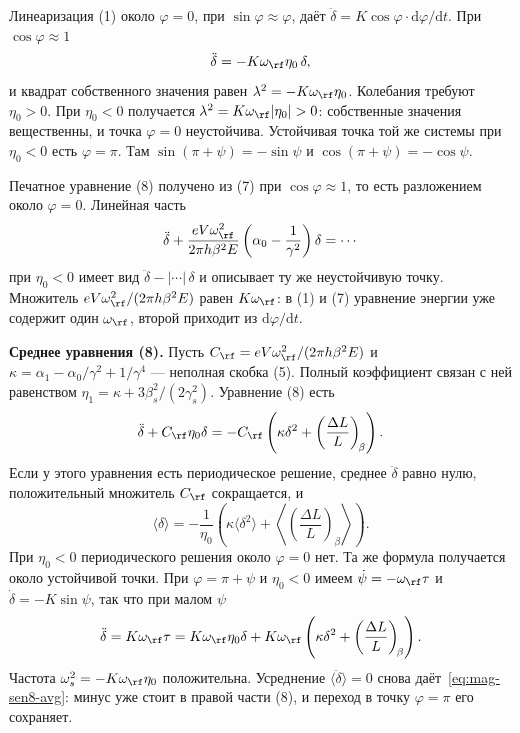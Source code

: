 Линеаризация (1) около $\varphi=0$, при $\sin\varphi\approx\varphi$, даёт $\ddot\delta=K\cos\varphi\cdot\mathrm{d}\varphi/\mathrm{d}t$. При $\cos\varphi\approx 1$
\begin{equation}
\label{eq:mag-sen-lin}
\ddot\delta=-K\omega_\rf\eta_0\,\delta,
\end{equation}
и квадрат собственного значения равен $\lambda^2=-K\omega_\rf\eta_0$. Колебания требуют $\eta_0>0$. При $\eta_0<0$ получается $\lambda^2=K\omega_\rf|\eta_0|>0$: собственные значения вещественны, и точка $\varphi=0$ неустойчива. Устойчивая точка той же системы при $\eta_0<0$ есть $\varphi=\pi$. Там $\sin(\pi+\psi)=-\sin\psi$ и $\cos(\pi+\psi)=-\cos\psi$.

Печатное уравнение (8) получено из (7) при $\cos\varphi\approx 1$, то есть разложением около $\varphi=0$. Линейная часть
\begin{equation}
\label{eq:mag-sen8-lin}
\ddot\delta
+\frac{eV\omega_\rf^2}{2\pi h\beta^2 E}
\left(\alpha_0-\frac{1}{\gamma^2}\right)\delta
=\cdots
\end{equation}
при $\eta_0<0$ имеет вид $\ddot\delta-|\cdots|\,\delta$ и описывает ту же неустойчивую точку. Множитель $eV\omega_\rf^2/(2\pi h\beta^2 E)$ равен $K\omega_\rf$: в (1) и (7) уравнение энергии уже содержит один $\omega_\rf$, второй приходит из $\mathrm{d}\varphi/\mathrm{d}t$.

\textbf{Среднее уравнения (8).}
Пусть $C_\rf=eV\omega_\rf^2/(2\pi h\beta^2 E)$ и $\kappa=\alpha_1-\alpha_0/\gamma^2+1/\gamma^4$ --- неполная скобка (5). Полный коэффициент связан с ней равенством $\eta_1=\kappa+3\beta_s^2/(2\gamma_s^2)$. Уравнение (8) есть
\begin{equation}
\label{eq:mag-sen8}
\ddot\delta+C_\rf\eta_0\delta
=-C_\rf
\left(
\kappa\delta^2+\left(\frac{\Delta L}{L}\right)_{\!\beta}
\right).
\end{equation}
Если у этого уравнения есть периодическое решение, среднее $\ddot\delta$ равно нулю, положительный множитель $C_\rf$ сокращается, и
\begin{equation}
\label{eq:mag-sen8-avg}
\langle\delta\rangle
=-\frac{1}{\eta_0}
\left(
\kappa\langle\delta^2\rangle
+\left\langle
\left(\frac{\Delta L}{L}\right)_{\!\beta}
\right\rangle
\right).
\end{equation}
При $\eta_0<0$ периодического решения около $\varphi=0$ нет. Та же формула получается около устойчивой точки. При $\varphi=\pi+\psi$ и $\eta_0<0$ имеем $\dot\psi=-\omega_\rf\tau$ и $\dot\delta=-K\sin\psi$, так что при малом $\psi$
\begin{equation}
\label{eq:mag-sen-pi}
\ddot\delta
=K\omega_\rf\tau
=K\omega_\rf\eta_0\delta
+K\omega_\rf
\left(
\kappa\delta^2+\left(\frac{\Delta L}{L}\right)_{\!\beta}
\right).
\end{equation}
Частота $\omega_s^2=-K\omega_\rf\eta_0$ положительна. Усреднение $\langle\ddot\delta\rangle=0$ снова даёт~\eqref{eq:mag-sen8-avg}: минус уже стоит в правой части (8), и переход в точку $\varphi=\pi$ его сохраняет.

